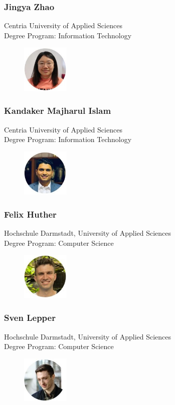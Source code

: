 \subsubsection{Jingya Zhao}
Centria University of Applied Sciences \\
Degree Program: Information Technology
\begin{figure}[h]
    \centering
    \includegraphics[width=0.2\textwidth]{images/jingya.JPG}
\end{figure}

\subsubsection{Kandaker Majharul Islam}
Centria University of Applied Sciences \\
Degree Program: Information Technology
\begin{figure}[h]
    \centering
    \includegraphics[width=0.2\textwidth]{images/ifty.JPG}
\end{figure}
\newpage
\subsubsection{Felix Huther}
Hochschule Darmstadt, University of Applied Sciences \\
Degree Program: Computer Science
\begin{figure}[h]
    \centering
    \includegraphics[width=0.2\textwidth]{images/felix.JPG}
\end{figure}

\subsubsection{Sven Lepper}
Hochschule Darmstadt, University of Applied Sciences \\
Degree Program: Computer Science
\begin{figure}[h]
    \centering
    \includegraphics[width=0.2\textwidth]{images/sven.JPG}
\end{figure}

